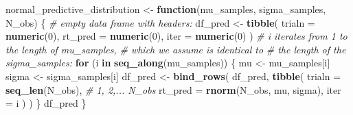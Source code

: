 \documentclass[12pt,ignorenonframetext,aspectratio=169]{beamer}
\newenvironment{Shaded}{\begin{snugshade}}{\end{snugshade}}
\newcommand{\CommentTok}[1]{\textcolor[rgb]{0.56,0.35,0.01}{\textit{#1}}}
\newcommand{\ControlFlowTok}[1]{\textcolor[rgb]{0.13,0.29,0.53}{\textbf{#1}}}
\newcommand{\DataTypeTok}[1]{\textcolor[rgb]{0.13,0.29,0.53}{#1}}
\newcommand{\DecValTok}[1]{\textcolor[rgb]{0.00,0.00,0.81}{#1}}
\newcommand{\KeywordTok}[1]{\textcolor[rgb]{0.13,0.29,0.53}{\textbf{#1}}}
\newcommand{\NormalTok}[1]{#1}
\newcommand{\StringTok}[1]{\textcolor[rgb]{0.31,0.60,0.02}{#1}}
\begin{document}
\begin{frame}[fragile]

\vspace{.1in}

\scriptsize

\begin{Shaded}
\begin{Highlighting}[]
\NormalTok{normal_predictive_distribution <-}\StringTok{ }\ControlFlowTok{function}\NormalTok{(mu_samples, sigma_samples, N_obs) \{}
  \CommentTok{# empty data frame with headers:}
\NormalTok{  df_pred <-}\StringTok{ }\KeywordTok{tibble}\NormalTok{(}
    \DataTypeTok{trialn =} \KeywordTok{numeric}\NormalTok{(}\DecValTok{0}\NormalTok{),}
    \DataTypeTok{rt_pred =} \KeywordTok{numeric}\NormalTok{(}\DecValTok{0}\NormalTok{),}
    \DataTypeTok{iter =} \KeywordTok{numeric}\NormalTok{(}\DecValTok{0}\NormalTok{)}
\NormalTok{  )}
  \CommentTok{# i iterates from 1 to the length of mu_samples,}
  \CommentTok{# which we assume is identical to}
  \CommentTok{# the length of the sigma_samples:}
  \ControlFlowTok{for}\NormalTok{ (i }\ControlFlowTok{in} \KeywordTok{seq_along}\NormalTok{(mu_samples)) \{}
\NormalTok{    mu <-}\StringTok{ }\NormalTok{mu_samples[i]}
\NormalTok{    sigma <-}\StringTok{ }\NormalTok{sigma_samples[i]}
\NormalTok{    df_pred <-}\StringTok{ }\KeywordTok{bind_rows}\NormalTok{(}
\NormalTok{      df_pred,}
      \KeywordTok{tibble}\NormalTok{(}
        \DataTypeTok{trialn =} \KeywordTok{seq_len}\NormalTok{(N_obs), }\CommentTok{# 1, 2,... N_obs}
        \DataTypeTok{rt_pred =} \KeywordTok{rnorm}\NormalTok{(N_obs, mu, sigma),}
        \DataTypeTok{iter =}\NormalTok{ i}
\NormalTok{      )}
\NormalTok{    )}
\NormalTok{  \}}
\NormalTok{  df_pred}
\NormalTok{\}}
\end{Highlighting}
\end{Shaded}

\normalsize

\end{frame}
\end{document}
